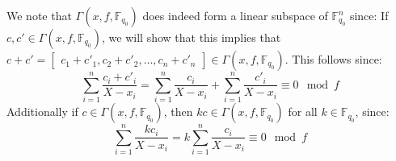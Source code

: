 We note that $\Gamma(x, f, \mathbb{F}_{q_0})$ does indeed form a linear subspace of $\mathbb{F}_{q_0}^n$ since:
If $c, c' \in \Gamma(x, f, \mathbb{F}_{q_0})$, we will show that this implies that $c + c' = \begin{bmatrix} c_1 + c'_1, c_2 + c'_2, \ldots, c_n + c'_{n} \end{bmatrix} \in \Gamma(x, f, \mathbb{F}_{q_0})$. This follows since:
\begin{equation*}
  \sum^n_{i = 1} \frac{c_{i} + c'_i}{X - x_{i}} = \sum^n_{i = 1} \frac{c_{i}}{X- x_i} + \sum^n_{i = 1} \frac{c'_{i}}{X - x_{i}} \equiv 0 \mod f
\end{equation*}
Additionally if $c \in \Gamma(x, f, \mathbb{F}_{q_0})$, then $k c \in \Gamma(x, f, \mathbb{F}_{q_0})$ for all $k \in \mathbb{F}_{q_0}$, since:
\begin{equation*}
  \sum^n_{i = 1} \frac{kc_{i}}{X - x_{i}} = k\sum^n_{i = 1} \frac{c_{i}}{X - x_{i}} \equiv 0 \mod f
\end{equation*}

